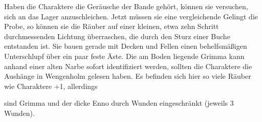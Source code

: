 Haben die Charaktere die Geräusche der Bande gehört, können sie versuchen, sich an das Lager anzuschleichen. Jetzt müssen sie eine vergleichende
\platz
{}
\platz
Gelingt die Probe, so können sie die Räuber auf einer kleinen, etwa zehn Schritt durchmessenden Lichtung überraschen, die durch den Sturz einer Buche entstanden ist. Sie bauen gerade mit Decken und Fellen einen behelfsmäßigen Unterschlupf über ein paar feste Äste. Die am Boden liegende Grimma kann anhand einer alten Narbe sofort identifiziert werden, sollten die Charaktere die Aushänge in Wengenholm gelesen haben. Es befinden sich hier so viele Räuber wie Charaktere +1, allerdings  




sind Grimma und der dicke Enno durch Wunden eingeschränkt (jeweils 3 Wunden).


